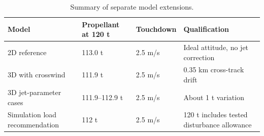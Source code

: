 \begin{table}[htbp]
\caption{Summary of separate model extensions.}
\label{tab:src13}
\small
\setlength{\tabcolsep}{3.5pt}
\begin{tabularx}{\linewidth}{@{}XXXX@{}}
\toprule
Model & Propellant at 120 t & Touchdown & Qualification \\
\midrule
2D reference & 113.0 t & 2.5 m/s & Ideal attitude, no jet correction \\
3D with crosswind & 111.9 t & 2.5 m/s & 0.35 km cross-track drift \\
3D jet-parameter cases & 111.9--112.9 t & 2.5 m/s & About 1 t variation \\
Simulation load recommendation & 112 t & 2.5 m/s & 120 t includes tested disturbance allowance \\
\bottomrule
\end{tabularx}
\par{}
\end{table}
